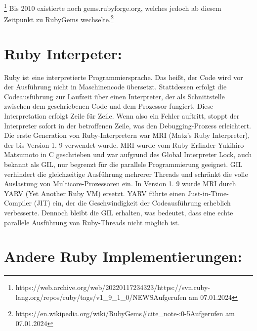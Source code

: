 \documentclass{article}
\begin{document}
\footnote{https://web.archive.org/web/20220117234323/https://svn.ruby-lang.org/repos/ruby/tags/v1\_9\_1\_0/NEWSAufgerufen am 07.01.2024}
Bis 2010 existierte noch gems.rubyforge.org, welches jedoch ab diesem Zeitpunkt zu RubyGems wechselte.\footnote{https://en.wikipedia.org/wiki/RubyGems\#cite\_note-:0-5Aufgerufen am 07.01.2024}
\section*{Ruby Interpeter:}


Ruby ist eine interpretierte Programmiersprache.
Das heißt, der Code wird vor der Ausführung nicht in Maschinencode übersetzt.
Stattdessen erfolgt die Codeausführung zur Laufzeit über einen Interpreter, der als Schnittstelle zwischen dem geschriebenen Code und dem Prozessor fungiert.
Diese Interpretation erfolgt Zeile für Zeile.
Wenn also ein Fehler auftritt, stoppt der Interpreter sofort in der betroffenen Zeile, was den Debugging-Prozess erleichtert.
Die erste Generation von Ruby-Interpretern war MRI (Matz's Ruby Interpreter), der bis Version 1.
9 verwendet wurde.
MRI wurde vom Ruby-Erfinder Yukihiro Matsumoto in C geschrieben und war aufgrund des Global Interpreter Lock, auch bekannt als GIL, nur begrenzt für die parallele Programmierung geeignet.
GIL verhindert die gleichzeitige Ausführung mehrerer Threads und schränkt die volle Auslastung von Multicore-Prozessoren ein.
In Version 1.
9 wurde MRI durch YARV (Yet Another Ruby VM) ersetzt.
YARV führte einen Just-in-Time-Compiler (JIT) ein, der die Geschwindigkeit der Codeausführung erheblich verbesserte.
Dennoch bleibt die GIL erhalten, was bedeutet, dass eine echte parallele Ausführung von Ruby-Threads nicht möglich ist.

\section*{Andere Ruby Implementierungen:}
\end{document}
